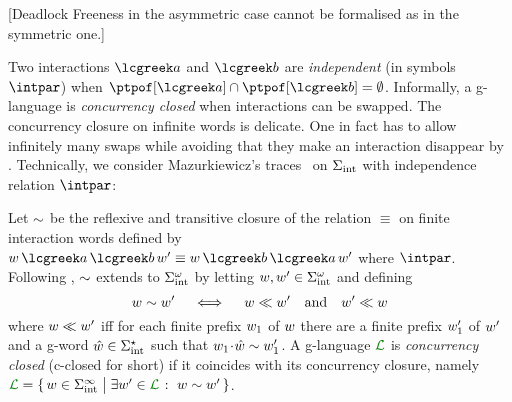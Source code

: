 

[Deadlock Freeness in the asymmetric case cannot be formalised as in the symmetric one.]


Two interactions $\aint$ and $\aint[b]$ are \emph{independent} (in
symbols $\intpar$)
when %
$\ptpof[\aint] \cap \ptpof[{\aint[b]}] = \emptyset$.
%
Informally, a g-language is \emph{concurrency closed} when
 interactions can be swapped.
%
The concurrency closure on infinite words is delicate.
%
One in fact has to allow infinitely many swaps while avoiding that
they make an interaction disappear by .
%
Technically, we consider Mazurkiewicz's traces~\cite{maz86} on
$\Sigma_{\text{int}}$ with independence relation $\intpar$:
\begin{definition}\label{def:cc}
  Let $\sim$ be the reflexive and transitive closure of the relation
  $\equiv$ on finite interaction words defined by
  $\acword\,\aint\,\aint[b]\,\acword' \equiv
  \acword\,\aint[b]\,\aint\,\acword'$ where $\intpar$.
  Following \emph{\cite[Def. 2.1]{Gastin90}}, $\sim$ extends to
  $\Sigma_{\text{int}}^\omega$ by letting $w,w'\in\Sigma_{\text{int}}^\omega$ and defining
  \[
	 w \sim w' \quad\iff\quad w \ll w' \quad\text{and}\quad w' \ll w
  \]
  where
  $w \ll w'$ iff for each finite prefix $w_1$ of
  $w$ there are a finite prefix $w_1'$ of $w'$ and a
  g-word $\hat {w} \in \Sigma_{\text{int}}^\star$ such that
  $w_1 \!\cdot\! \hat {w} \sim w_1'$.
  A g-language $\clang$ is \emph{concurrency closed} (c-closed for
  short) if it coincides with its concurrency closure, namely
  $\clang = \Set{\acword \in \alfint^\infty \sst \exists
	 \acword'\in\clang \qst \acword \comm \acword'}$.
\end{definition}

